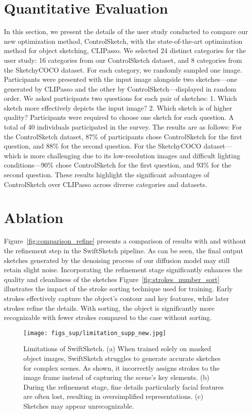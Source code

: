 {\section{Quantitative Evaluation}
In this section, we present the details of the user study conducted to compare our new optimization method, ControlSketch, with the state-of-the-art optimization method for object sketching, CLIPasso.
We selected 24 distinct categories for the user study: 16 categories from our ControlSketch dataset, and 8 categories from the SketchyCOCO dataset. For each category, we randomly sampled one image. Participants were presented with the input image alongside two sketches—one generated by CLIPasso and the other by ControlSketch—displayed in random order. We asked participants two questions for each pair of sketches: 1. Which sketch more effectively depicts the input image? 2. Which sketch is of higher quality? Participants were required to choose one sketch for each question. A total of 40 individuals participated in the survey. The results are as follows: For the ControlSketch dataset, 87\% of participants chose ControlSketch for the first question, and 88\% for the second question. For the SketchyCOCO dataset—which is more challenging due to its low-resolution images and difficult lighting conditions—90\% chose ControlSketch for the first question, and 93\% for the second question.
These results highlight the significant advantages of ControlSketch over CLIPasso across diverse categories and datasets.


\section{Ablation}
Figure~\ref{fig:comparison_refine} presents a comparison of results with and without the refinement step in the SwiftSketch pipeline. As can be seen, the final output sketches generated by the denoising process of our diffusion model may still retain slight noise. Incorporating the refinement stage significantly enhances the quality and cleanliness of the sketches
Figure~\ref{fig:strokes_number_sort} illustrates the impact of the stroke sorting technique used for training. Early strokes effectively capture the object’s contour and key features, while later strokes refine the details. With sorting, the object is significantly more recognizable with fewer strokes compared to the case without sorting.



\begin{figure}
    \centering
    \texttt{[image: figs\_sup/limitation\_supp\_new.jpg]}
    \caption{Limitations of SwiftSketch. (a) When trained solely on masked object images, SwiftSketch struggles to generate accurate sketches for complex scenes. As shown, it incorrectly assigns strokes to the image frame instead of capturing the scene's key elements. (b) During the refinement stage, fine details particularly facial features are often lost, resulting in oversimplified representations. (c) Sketches may appear unrecognizable. }
    \label{fig:limitations1}
\end{figure}


}
